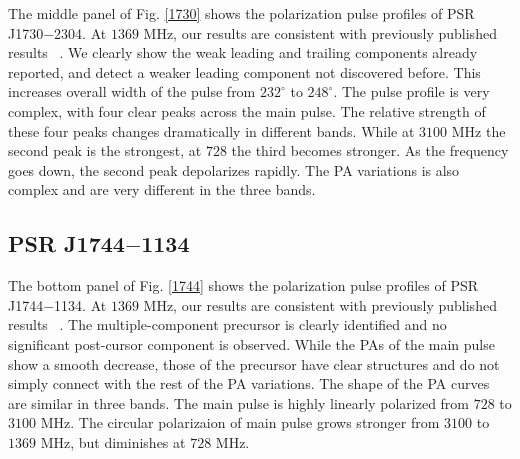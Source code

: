 \documentclass[useAMS,usenatbib]{mn2e}
\begin{document}
\begin{appendices}
The middle panel of Fig. \ref{1730} shows the polarization pulse profiles of 
PSR J1730$-$2304.
%
At $1369$ MHz, our results are consistent with previously published results
~\citep{Ord04,Yan11}. 
%
We clearly show the weak leading and trailing components already reported, 
and detect a weaker leading component not discovered before. This increases 
overall width of the pulse from $232^{\circ}$ to $248^{\circ}$.
%
The pulse profile is very complex, with four clear peaks across the main pulse.
%
The relative strength of these four peaks changes dramatically in different 
bands. While at $3100$ MHz the second peak is the strongest, at $728$ the third 
becomes stronger. 
%
As the frequency goes down, the second peak depolarizes rapidly.
%
The PA variations is also complex and are very different in the three bands.


%


\subsection{PSR J1744$-$1134}

The bottom panel of Fig. \ref{1744} shows the polarization pulse profiles of 
PSR J1744$-$1134.
%
At $1369$ MHz, our results are consistent with previously published results
~\citep{Yan11}.
%
The multiple-component precursor is clearly identified and no significant 
post-cursor component is observed.
%
While the PAs of the main pulse show a smooth decrease, those of the precursor 
have clear structures and do not simply connect with the rest of the PA 
variations.
%
The shape of the PA curves are similar in three bands.
%
The main pulse is highly linearly polarized from $728$ to $3100$ MHz. 
The circular polarizaion of main pulse grows stronger from $3100$ to $1369$ MHz, 
but diminishes at $728$ MHz.


\end{appendices}
\end{document}
